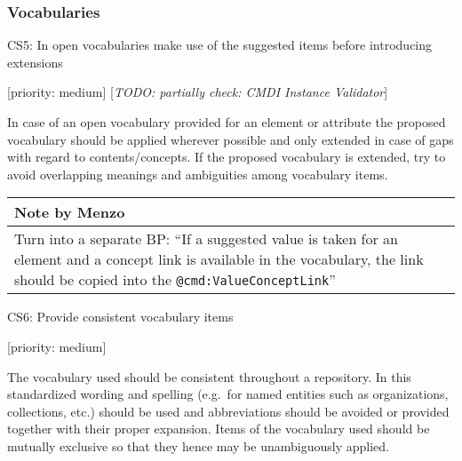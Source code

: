 \subsubsection{Vocabularies}\label{vocabularies}

CS5: In open vocabularies make use of the suggested items before
introducing extensions

{[}priority: medium{]} {[}\emph{TODO: partially check: CMDI Instance
Validator}{]}

In case of an open vocabulary provided for an element or attribute the
proposed vocabulary should be applied wherever possible and only
extended in case of gaps with regard to contents/concepts. If the
proposed vocabulary is extended, try to avoid overlapping meanings and
ambiguities among vocabulary items.

\begin{longtable}[c]{@{}l@{}}
\toprule
\begin{minipage}[b]{0.07\columnwidth}\raggedright\strut
Note by Menzo
\strut\end{minipage}\tabularnewline
\midrule
\endhead
\begin{minipage}[t]{0.07\columnwidth}\raggedright\strut
Turn into a separate BP: ``If a suggested value is taken for an element
and a concept link is available in the vocabulary, the link should be
copied into the \texttt{@cmd:ValueConceptLink}''
\strut\end{minipage}\tabularnewline
\bottomrule
\end{longtable}

CS6: Provide consistent vocabulary items

{[}priority: medium{]}

The vocabulary used should be consistent throughout a repository. In
this standardized wording and spelling (e.g.~for named entities such as
organizations, collections, etc.) should be used and abbreviations
should be avoided or provided together with their proper expansion.
Items of the vocabulary used should be mutually exclusive so that they
hence may be unambiguously applied.
